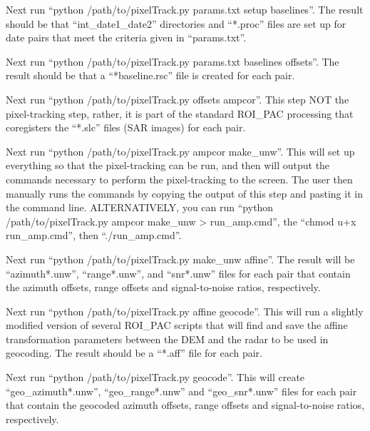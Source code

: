 \documentclass[12pt]{article}
\begin{document}
Next run ``python /path/to/pixelTrack.py params.txt setup baselines''.
The result should be that ``int\_date1\_date2'' directories and ``*.proc'' files are set up for date pairs that meet the criteria given in ``params.txt''.

Next run ``python /path/to/pixelTrack.py params.txt baselines offsets''.
The result should be that a ``*baseline.rsc'' file is created for each pair.

Next run ``python /path/to/pixelTrack.py offsets ampcor''.
This step NOT the pixel-tracking step, rather, it is part of the standard ROI\_PAC processing that coregisters the ``*.slc'' files (SAR images) for each pair.

Next run ``python /path/to/pixelTrack.py ampcor make\_unw''.
This will set up everything so that the pixel-tracking can be run, and then will output the commands necessary to perform the pixel-tracking to the screen.
The user then manually runs the commands by copying the output of this step and pasting it in the command line.
ALTERNATIVELY, you can run ``python /path/to/pixelTrack.py ampcor make\_unw > run\_amp.cmd'', the ``chmod u+x run\_amp.cmd'', then ``./run\_amp.cmd''.

Next run ``python /path/to/pixelTrack.py make\_unw affine''.
The result will be ``azimuth*.unw'', ``range*.unw'', and ``snr*.unw'' files for each pair that contain the azimuth offsets, range offsets and signal-to-noise ratios, respectively.

Next run ``python /path/to/pixelTrack.py affine geocode''.
This will run a slightly modified version of several ROI\_PAC scripts that will find and save the affine transformation parameters between the DEM and the radar to be used in geocoding.
The result should be a ``*.aff'' file for each pair.

Next run ``python /path/to/pixelTrack.py geocode''.
This will create ``geo\_azimuth*.unw'', ``geo\_range*.unw'' and ``geo\_snr*.unw'' files for each pair that contain the geocoded azimuth offsets, range offsets and signal-to-noise ratios, respectively.


\end{document}
